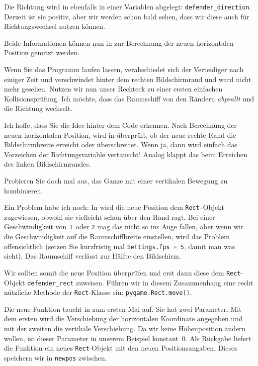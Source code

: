 Die Richtung wird in  ebenfalls in einer Variablen abgelegt: \texttt{defender\_direction}. Derzeit ist sie positiv, aber wir werden schon bald sehen, dass wir diese auch für Richtungswechsel nutzen können.

Beide Informationen können nun in  zur Berechnung der neuen horizontalen Position genutzt werden.

Wenn Sie das Programm laufen lassen, verabschiedet sich der Verteidiger nach einiger Zeit und verschwindet hinter dem rechten Bildschirmrand und ward nicht mehr gesehen. Nutzen wir nun unser Rechteck zu einer ersten einfachen Kollisionsprüfung. Ich möchte, dass das Raumschiff von den Rändern \emph{abprallt} und die Richtung wechselt. 


Ich hoffe, dass Sie die Idee hinter dem Code erkennen. Nach Berechnung der neuen horizontalen Position, wird in  überprüft, ob der neue rechte Rand die Bildschirmbreite erreicht oder überschreitet. Wenn ja, dann wird einfach das Vorzeichen der Richtungsvariable vertauscht! Analog klappt das beim Erreichen des linken Bildschirmrandes. 

Probieren Sie doch mal aus, das Ganze mit einer vertikalen Bewegung zu kombinieren.

Ein Problem habe ich noch: In  wird die neue Position dem \texttt{Rect-}Objekt zugewiesen, obwohl sie vielleicht schon über den Rand ragt. Bei einer Geschwindigkeit von~\texttt{1} oder \texttt{2} mag das nicht so ins Auge fallen, aber wenn wir die Geschwindigkeit auf die Raumschiffbreite einstellen, wird das Problem offensichtlich (setzen Sie kurzfristig mal \texttt{Settings.fps = 5}, damit man was sieht). Das Raumschiff verlässt zur Hälfte den Bildschirm. 

Wir sollten somit die neue Position überprüfen und erst dann diese dem \texttt{Rect}-Objekt \texttt{defender\_rect} zuweisen. Führen wir in diesem Zusammenhang eine recht nützliche Methode der \texttt{Rect}-Klasse ein: \texttt{pygame.Rect.move()}.


Die neue Funktion taucht in  zum ersten Mal auf. Sie hat zwei Parameter. Mit dem ersten wird die Verschiebung der horizontalen Koordinate angegeben und mit der zweiten die vertikale Verschiebung. Da wir keine Höhenposition ändern wollen, ist dieser Parameter in unserem Beispiel konstant~0. Als Rückgabe liefert die Funktion ein neues \texttt{Rect}-Objekt mit den neuen Positionsangaben. Dieses speichern wir in \texttt{newpos} zwischen.

